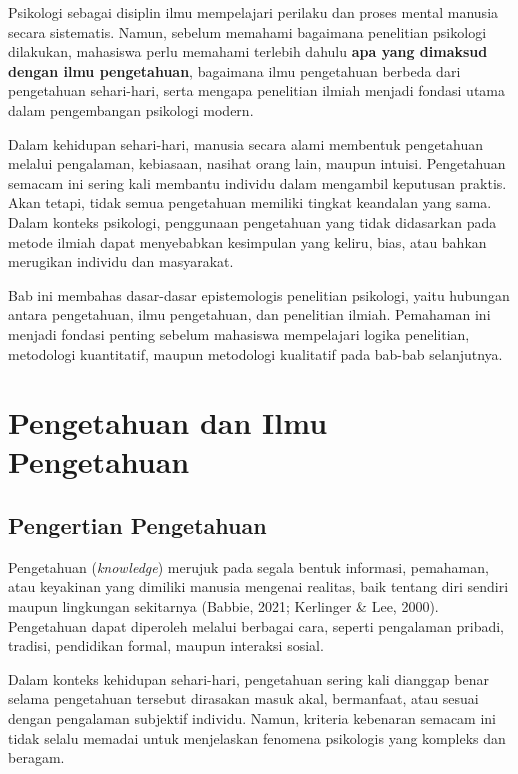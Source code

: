 \documentclass[
  indonesian,
  letterpaper,
  DIV=11,
  numbers=noendperiod]{scrreprt}
\begin{document}
Psikologi sebagai disiplin ilmu mempelajari perilaku dan proses mental
manusia secara sistematis. Namun, sebelum memahami bagaimana penelitian
psikologi dilakukan, mahasiswa perlu memahami terlebih dahulu
\textbf{apa yang dimaksud dengan ilmu pengetahuan}, bagaimana ilmu
pengetahuan berbeda dari pengetahuan sehari-hari, serta mengapa
penelitian ilmiah menjadi fondasi utama dalam pengembangan psikologi
modern.

Dalam kehidupan sehari-hari, manusia secara alami membentuk pengetahuan
melalui pengalaman, kebiasaan, nasihat orang lain, maupun intuisi.
Pengetahuan semacam ini sering kali membantu individu dalam mengambil
keputusan praktis. Akan tetapi, tidak semua pengetahuan memiliki tingkat
keandalan yang sama. Dalam konteks psikologi, penggunaan pengetahuan
yang tidak didasarkan pada metode ilmiah dapat menyebabkan kesimpulan
yang keliru, bias, atau bahkan merugikan individu dan masyarakat.

Bab ini membahas dasar-dasar epistemologis penelitian psikologi, yaitu
hubungan antara pengetahuan, ilmu pengetahuan, dan penelitian ilmiah.
Pemahaman ini menjadi fondasi penting sebelum mahasiswa mempelajari
logika penelitian, metodologi kuantitatif, maupun metodologi kualitatif
pada bab-bab selanjutnya.

\section{Pengetahuan dan Ilmu
Pengetahuan}\label{pengetahuan-dan-ilmu-pengetahuan}

\subsection{Pengertian Pengetahuan}\label{pengertian-pengetahuan}

Pengetahuan (\emph{knowledge}) merujuk pada segala bentuk informasi,
pemahaman, atau keyakinan yang dimiliki manusia mengenai realitas, baik
tentang diri sendiri maupun lingkungan sekitarnya (Babbie, 2021;
Kerlinger \& Lee, 2000). Pengetahuan dapat diperoleh melalui berbagai
cara, seperti pengalaman pribadi, tradisi, pendidikan formal, maupun
interaksi sosial.

Dalam konteks kehidupan sehari-hari, pengetahuan sering kali dianggap
benar selama pengetahuan tersebut dirasakan masuk akal, bermanfaat, atau
sesuai dengan pengalaman subjektif individu. Namun, kriteria kebenaran
semacam ini tidak selalu memadai untuk menjelaskan fenomena psikologis
yang kompleks dan beragam.
\end{document}
